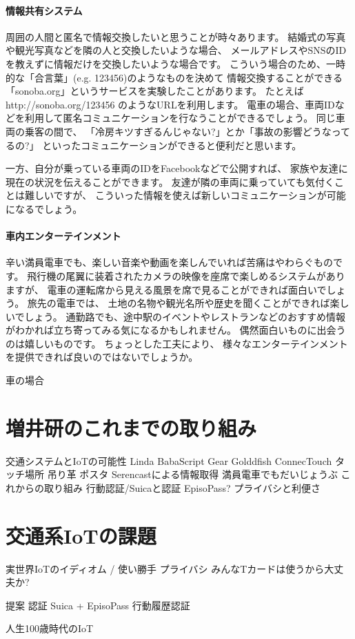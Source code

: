 \documentclass[twocolumn,10pt]{jarticle}
\begin{document}
\paragraph{情報共有システム}
  
  周囲の人間と匿名で情報交換したいと思うことが時々あります。 結婚式の写真や観光写真などを隣の人と交換したいような場合、 メールアドレスやSNSのIDを教えずに情報だけを交換したいような場合です。
  こういう場合のため、一時的な「合言葉」(e.g. 123456)のようなものを決めて 情報交換することができる「sonoba.org」というサービスを実験したことがあります。 たとえばhttp://sonoba.org/123456 のようなURLを利用します。
  電車の場合、車両IDなどを利用して匿名コミュニケーションを行なうことができるでしょう。 同じ車両の乗客の間で、 「冷房キツすぎるんじゃない?」とか「事故の影響どうなってるの?」 といったコミュニケーションができると便利だと思います。

  一方、自分が乗っている車両のIDをFacebookなどで公開すれば、 家族や友達に現在の状況を伝えることができます。 友達が隣の車両に乗っていても気付くことは難しいですが、 こういった情報を使えば新しいコミュニケーションが可能になるでしょう。

\paragraph{車内エンターテインメント}
  
  辛い満員電車でも、楽しい音楽や動画を楽しんでいれば苦痛はやわらぐものです。 飛行機の尾翼に装着されたカメラの映像を座席で楽しめるシステムがありますが、 電車の運転席から見える風景を席で見ることができれば面白いでしょう。
  旅先の電車では、 土地の名物や観光名所や歴史を聞くことができれば楽しいでしょう。 通勤路でも、途中駅のイベントやレストランなどのおすすめ情報がわかれば立ち寄ってみる気になるかもしれません。 偶然面白いものに出会うのは嬉しいものです。 ちょっとした工夫により、 様々なエンターテインメントを提供できれば良いのではないでしょうか。



  
車の場合



\section{増井研のこれまでの取り組み}

交通システムとIoTの可能性
Linda
BabaScript
Gear
Golddfish
ConnecTouch
タッチ場所
吊り革
ポスタ
Serencastによる情報取得
満員電車でもだいじょうぶ
これからの取り組み
行動認証/Suicaと認証
EpisoPass?
プライバシと利便さ


\section{交通系IoTの課題}


実世界IoTのイディオム / 使い勝手
プライバシ
みんなTカードは使うから大丈夫か?

提案
認証
Suica + EpisoPass
行動履歴認証

人生100歳時代のIoT
\end{document}
